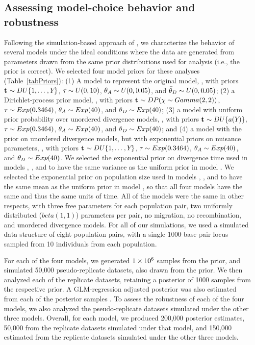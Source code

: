 \subsection*{Assessing model-choice behavior and robustness}
Following the simulation-based approach of \citet{Oaks2012}, we characterize
the behavior of several models under the ideal conditions where the
data are generated from parameters drawn from the same prior distributions used
for analysis (i.e., the prior is correct).
We selected four model priors for these analyses (Table~\ref{tabPriors}):
(1) A model to represent the original \msb model, \modelOld, with
priors
$\mathbf{t_{}} \sim DU\{1, \ldots, Y_{}\}$,
$\tau_{} \sim U(0,10)$,
$\ancestralTheta{} \sim U(0, 0.05)$,
and
$\descendantThetaMean{} \sim U(0, 0.05)$;
(2) a Dirichlet-process prior model, \modelDPP, with priors
$\mathbf{t_{}} \sim DP(\chi \sim Gamma(2,2))$,
$\tau_{} \sim Exp(0.3464)$,
$\ancestralTheta{} \sim Exp(40)$,
and
$\descendantTheta{}{} \sim Exp(40)$;
(3) a model with uniform prior probability over unordered divergence models,
\modelUniform, with priors
$\mathbf{t_{}} \sim DU\{a({Y_{}})\}$,
$\tau_{} \sim Exp(0.3464)$,
$\ancestralTheta{} \sim Exp(40)$,
and
$\descendantTheta{}{} \sim Exp(40)$;
and
(4) a model with the \msb prior on unordered divergence models, but with
exponential priors on nuisance parameters,
\modelUshaped, with priors
$\mathbf{t_{}} \sim DU\{1, \ldots, Y_{}\}$,
$\tau_{} \sim Exp(0.3464)$,
$\ancestralTheta{} \sim Exp(40)$,
and
$\descendantTheta{}{} \sim Exp(40)$.
We selected the exponential prior on divergence time used in models \modelDPP,
\modelUniform, and \modelUshaped to have the same variance as the uniform prior
in model \modelOld.
We selected the exponential prior on population size used in models \modelDPP,
\modelUniform, and \modelUniform to have the same mean as the uniform prior in
model \modelOld, so that all four models have the same  and thus the
same units of time.
All of the models were the same in other respects, with three free \myTheta{}
parameters for each population pair, two uniformly distributed ($beta(1,1)$)
\bottleScalar{}{} parameters per pair, no migration, no recombination,
and unordered divergence models.
For all of our simulations, we used a simulated data structure of eight
population pairs, with a single 1000 base-pair locus sampled from 10
individuals from each population.

For each of the four models, we generated $1\times 10^{6}$ samples from the prior, and
simulated 50,000 pseudo-replicate datasets, also drawn from the prior.
We then analyzed each of the replicate datasets, retaining a
posterior of 1000 samples from the respective prior.
A GLM-regression adjusted posterior was also estimated from each of the
posterior samples \citep{Leuenberger2010}.
To assess the robustness of each of the four models, we also analyzed the
pseudo-replicate datasets simulated under the other three models.
Overall, for each model, we produced 200,000 posterior estimates,
50,000 from the replicate datasets simulated under that model,
and 150,000 estimated from the replicate datasets simulated under the
other three models.

